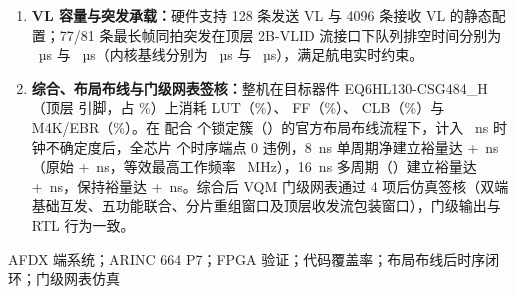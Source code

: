 \documentclass[a4paper,zihao=-4,fontset=none,oneside,openany]{ctexrep}
\providecommand{\heiti}{\CJKfamily{zhhei}}
\begin{document}
\begin{enumerate}[label=（\arabic*）]
  \item \textbf{VL 容量与突发承载：}硬件支持 128 条发送 VL 与 4096 条接收 VL 的静态配置；77/81 条最长帧同拍突发在顶层 2B-VLID 流接口下队列排空时间分别为 \BurstSevSeven~µs 与 \BurstEightOne~µs（内核基线分别为 \BurstSevSevenBase~µs 与 \BurstEightOneBase~µs），满足航电实时约束。
  \item \textbf{综合、布局布线与门级网表签核：}整机在目标器件 EQ6HL130-CSG484\_H（顶层 \Pins{} 引脚，占 \PinPct\%）上消耗 \Lut{} LUT（\LutPct\%）、\FF{} FF（\FFPct\%）、\Clb{} CLB（\ClbPct\%）与 \Mem{} M4K/EBR（\MemPct\%）。在  配合 \countsep{\LockedClusters} 个锁定簇（）的官方布局布线流程下，计入 \ClkUncert~ns 时钟不确定度后，全芯片 \countsep{\RoutedEndpoints} 个时序端点 0 违例，8~ns 单周期净建立裕量达 +\RoutedSetup~ns（原始 +\RoutedSetupRaw~ns，等效最高工作频率 \RoutedFmax~MHz），16~ns 多周期（）建立裕量达 +\MulticycleSetup~ns，保持裕量达 +\RoutedHold~ns。综合后 VQM 门级网表通过 4 项后仿真签核（双端基础互发、五功能联合、分片重组窗口及顶层收发流包装窗口），门级输出与 RTL 行为一致。
\end{enumerate}

\vspace{6pt}
\noindent{\heiti 关键词：}AFDX 端系统；ARINC 664 P7；FPGA 验证；代码覆盖率；布局布线后时序闭环；门级网表仿真

\endgroup
\clearpage
\setcounter{tocdepth}{1}
\begingroup
\small\linespread{1.08}\selectfont
\setlength{\parskip}{0pt}
\tableofcontents
\endgroup
\clearpage
{}








\appendix


\end{document}
